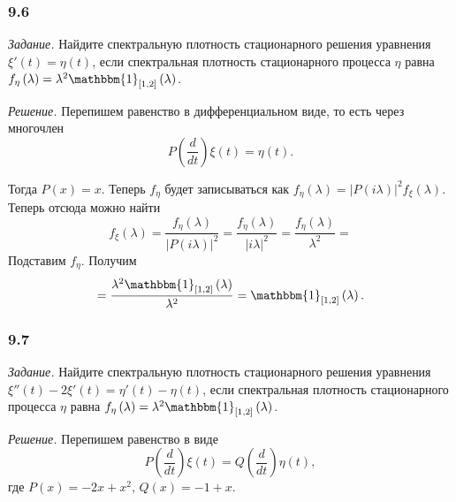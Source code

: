 \subsubsection*{9.6}

\textit{Задание.}
Найдите спектральную плотность стационарного решения уравнения
$ \xi' \left( t \right) =
  \eta \left( t \right) $,
если спектральная плотность стационарного процесса $ \eta $ равна
$f_{ \eta } \left( \lambda \right) =
  \lambda^2 \mathbbm{1}_{ \left[ 1, 2 \right] } \left( \lambda \right) $.

\textit{Решение.}
Перепишем равенство в дифференциальном виде, то есть через многочлен
\begin{equation*}
  P \left( \frac{d}{dt} \right) \xi \left( t \right) =
  \eta \left( t \right).
\end{equation*}

Тогда $P \left( x \right) = x$.
Теперь $f_{ \eta }$ будет записываться как
$f_{ \eta } \left( \lambda \right) =
  \left| P \left( i \lambda \right) \right|^2
  f_{ \xi } \left( \lambda \right) $.
Теперь отсюда можно найти
\begin{equation*}
  f_{ \xi } \left( \lambda \right) =
  \frac{f_{ \eta } \left( \lambda \right) }{ \left| P \left( i \lambda \right) \right|^2} =
  \frac{f_{ \eta } \left( \lambda \right) }{ \left| i \lambda \right|^2} =
  \frac{f_{ \eta } \left( \lambda \right) }{ \lambda^2} =
\end{equation*}
Подставим $f_{ \eta }$.
Получим
\begin{equation*}
  = \frac{ \lambda^2 \mathbbm{1}_{ \left[ 1, 2 \right] } \left( \lambda \right) }{ \lambda^2 } =
  \mathbbm{1}_{ \left[ 1, 2 \right] } \left( \lambda \right).
\end{equation*}

\subsubsection*{9.7}

\textit{Задание.}
Найдите спектральную плотность стационарного решения уравнения
$ \xi'' \left( t \right) - 2 \xi' \left( t \right) =
  \eta' \left( t \right) - \eta \left( t \right) $,
если спектральная плотность стационарного процесса $ \eta $ равна
$f_{ \eta } \left( \lambda \right) =
  \lambda^2 \mathbbm{1}_{ \left[ 1, 2 \right] } \left( \lambda \right) $.

\textit{Решение.}
Перепишем равенство в виде
\begin{equation*}
  P \left( \frac{d}{dt} \right) \xi \left( t \right) =
  Q \left( \frac{d}{dt} \right) \eta \left( t \right),
\end{equation*}
где $P \left( x \right) = -2x + x^2, \, Q \left( x \right) = -1 + x$.

